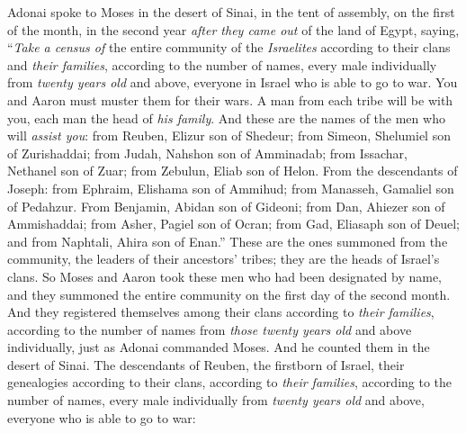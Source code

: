 
\begin{biblechapter} %
 Adonai spoke to Moses in the desert of Sinai, in the tent of assembly, on the first of the month, in the second year \textit{after they came out} of the land of Egypt, saying,
\verse “\textit{Take a census of} the entire community of the \textit{Israelites} according to their clans and \textit{their families}, according to the number of names, every male individually
\verse from \textit{twenty years old} and above, everyone in Israel who is able to go to war. You and Aaron must muster them for their wars.
\verse A man from each tribe will be with you, each man the head of \textit{his family}.
\verse And these are the names of the men who will \textit{assist you}: from Reuben, Elizur son of Shedeur;
\verse from Simeon, Shelumiel son of Zurishaddai;
\verse from Judah, Nahshon son of Amminadab;
\verse from Issachar, Nethanel son of Zuar;
\verse from Zebulun, Eliab son of Helon.
\verse From the descendants of Joseph: from Ephraim, Elishama son of Ammihud; from Manasseh, Gamaliel son of Pedahzur.
\verse From Benjamin, Abidan son of Gideoni;
\verse from Dan, Ahiezer son of Ammishaddai;
\verse from Asher, Pagiel son of Ocran;
\verse from Gad, Eliasaph son of Deuel;
\verse and from Naphtali, Ahira son of Enan.”
\verse These are the ones summoned from the community, the leaders of their ancestors’ tribes; they are the heads of Israel’s clans.
\verse So Moses and Aaron took these men who had been designated by name,
\verse and they summoned the entire community on the first day of the second month. And they registered themselves among their clans according to \textit{their families}, according to the number of names from \textit{those twenty years old} and above individually,
\verse just as Adonai commanded Moses. And he counted them in the desert of Sinai.
\verse The descendants of Reuben, the firstborn of Israel, their genealogies according to their clans, according to \textit{their families}, according to the number of names, every male individually from \textit{twenty years old} and above, everyone who is able to go to war:

\end{biblechapter}
